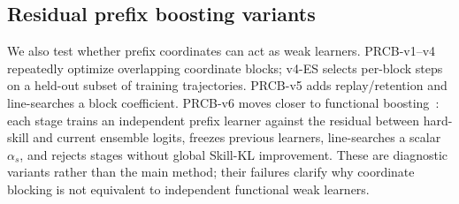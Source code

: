 \subsection{Residual prefix boosting variants}
\label{sec:prcb}
We also test whether prefix coordinates can act as weak learners.  PRCB-v1--v4 repeatedly optimize overlapping coordinate blocks; v4-ES selects per-block steps on a held-out subset of training trajectories.  PRCB-v5 adds replay/retention and line-searches a block coefficient.  PRCB-v6 moves closer to functional boosting~\citep{friedman2001greedy}: each stage trains an independent prefix learner against the residual between hard-skill and current ensemble logits, freezes previous learners, line-searches a scalar $\alpha_s$, and rejects stages without global Skill-KL improvement.  These are diagnostic variants rather than the main method; their failures clarify why coordinate blocking is not equivalent to independent functional weak learners.
